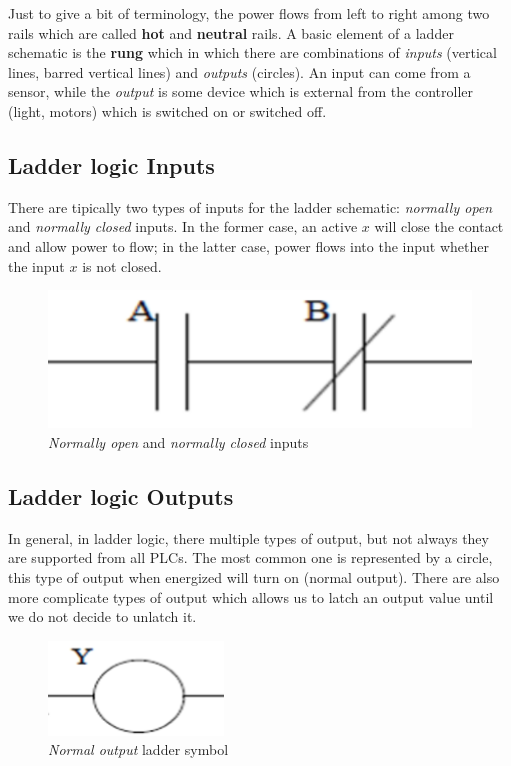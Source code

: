 Just to give a bit of terminology, the power flows from left to  right among two rails which are called \textbf{hot} and \textbf{neutral} rails. A basic element of a ladder schematic is the \textbf{rung} which in which there are combinations of \textit{inputs} (vertical lines, barred vertical lines) and \textit{outputs} (circles). An input can come from a sensor, while the \textit{output} is some device which is external from the controller (light, motors) which is switched on or switched off.

\subsection{Ladder logic Inputs}
There are tipically two types of inputs for the ladder schematic: \textit{normally open} and \textit{normally closed} inputs. In the former case, an active $x$ will  close the contact and allow power to flow; in the latter case, power flows into the input whether the input $x$ is not closed. 

\begin{figure}
    \centering
    \includegraphics[scale=0.5]{img/ladder_inputs.png}
    \caption{\textit{Normally open} and \textit{normally closed} inputs}
\end{figure}

\subsection{Ladder logic Outputs}
In general, in ladder logic, there multiple types of output, but not always they are supported from all PLCs. The most common one is represented by a circle, this type of output when energized will turn on (normal output). There are also more complicate types of output which allows us to latch an output value until we do not decide to unlatch it. 

\begin{figure}[h]
    \centering
    \includegraphics[scale=1]{img/ladder_output.png}
    \caption{\textit{Normal output} ladder symbol}
\end{figure}

